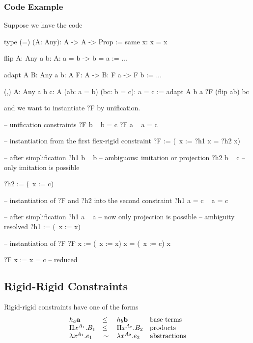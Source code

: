 \subsubsection{Code Example}

Suppose we have the code
\begin{alba}
    type (=) (A: Any): A -> A -> Prop :=
        same {x}: x = x

    flip {A: Any} {a b: A}: a = b -> b = a :=
        ...

    adapt {A B: Any} {a b: A} {F: A -> B}: F a -> F b :=
        ...

    (,) {A: Any} {a b c: A} (ab: a = b) (bc: b = c): a = c :=
        adapt {A} {b} {a} {?F} (flip ab) bc
\end{alba}
%
and we want to instantiate ?F by unification.

\begin{alba}
    -- unification constraints
    ?F b   ~   b = c
    ?F a   ~   a = c

    -- instantiation from the first flex-rigid constraint
    ?F := (\ x := ?h1 x = ?h2 x)

    -- after simplification
    ?h1 b  ~  b             -- ambiguous: imitation or projection
    ?h2 b  ~  c             -- only imitation is possible

    ?h2 := (\ x := c)

    -- instantiation of ?F and ?h2 into the second constraint
    ?h1 a = c    ~    a = c

    -- after simplification
    ?h1 a  ~  a             -- now only projection is possible
                            -- ambiguity resolved
    ?h1 := (\ x := x)

    -- instantiation of ?F
    ?F x := (\ x := x) x = (\ x := c) x

    ?F x := x = c   -- reduced
\end{alba}









\subsection{Rigid-Rigid Constraints}

Rigid-rigid constraints have one of the forms
$$
    \begin{array}{lllll} 
        h_a {\mathbf a} &\le& h_b {\mathbf b}
        & \text{base terms}
        \\
        \Pi x^{A_1}. B_1 &\le& \Pi x^{A_2}. B_2
        & \text{products}
        \\
        \lambda x^{A_1}. e_1 &\,\sim\,& \lambda x^{A_2}. e_2
        & \text{abstractions}
     \end{array}
$$

